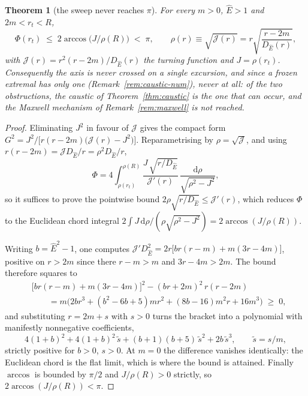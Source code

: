 \documentclass[12pt]{iopart}
\newcommand{\Ehat}{\hat E}
\newcommand{\dd}{\mathrm{d}}
\theoremstyle{plain}
\theoremstyle{definition}
\theoremstyle{plain}
\newtheorem{auxtheorem}[auxlemma]{Theorem}
\theoremstyle{remark}
\begin{document}
\begin{auxtheorem}[the sweep never reaches $\pi$]\label{thm:chord}
For every $m>0$, $\Ehat>1$ and $2m<r_t<R$,
\begin{equation}
   \Phi(r_t)\;\le\;2\arccos\!\big(J/\rho(R)\big)\;<\;\pi,
   \qquad \rho(r)\equiv\sqrt{\mathcal J(r)}=r\sqrt{\frac{r-2m}{D_{\Ehat}(r)}},
   \label{eq:chord-bound}
\end{equation}
with $\mathcal J(r)=r^2(r-2m)/D_{\Ehat}(r)$ the turning function and $J=\rho(r_t)$.
Consequently the axis is never crossed on a single excursion, and since a frozen extremal
has only one (Remark~\ref{rem:caustic-num}), never at all: of the two obstructions, the
caustic of Theorem~\ref{thm:caustic} is the one that can occur, and the Maxwell mechanism
of Remark~\ref{rem:maxwell} is not reached.
\end{auxtheorem}

\begin{proof}
Eliminating $J^2$ in favour of $\mathcal J$ gives the compact form
$G^2=J^2/\big[r(r-2m)\big(\mathcal J(r)-J^2\big)\big]$. Reparametrising by
$\rho=\sqrt{\mathcal J}$, and using $r(r-2m)=\mathcal J D_{\Ehat}/r=\rho^2D_{\Ehat}/r$,
\[
   \Phi=4\int_{\rho(r_t)}^{\rho(R)}
   \frac{J\,\sqrt{r/D_{\Ehat}}}{\mathcal J'(r)}\,
   \frac{\dd\rho}{\sqrt{\rho^2-J^2}} ,
\]
so it suffices to prove the pointwise bound $2\rho\sqrt{r/D_{\Ehat}}\le\mathcal J'(r)$,
which reduces $\Phi$ to the Euclidean chord integral
$2\int J\,\dd\rho/(\rho\sqrt{\rho^2-J^2})=2\arccos(J/\rho(R))$.

Writing $b=\Ehat^2-1$, one computes
$\mathcal J'D_{\Ehat}^2=2r\big[br(r-m)+m(3r-4m)\big]$, positive on $r>2m$ since there
$r-m>m$ and $3r-4m>2m$. The bound therefore squares to
\begin{align*}
   &\big[br(r-m)+m(3r-4m)\big]^2-(br+2m)^2\,r(r-2m)\\
   &\qquad=m\big(2br^3+(b^2-6b+5)mr^2+(8b-16)m^2r+16m^3\big)\;\ge\;0 ,
\end{align*}
and substituting $r=2m+s$ with $s>0$ turns the bracket into a polynomial with manifestly
nonnegative coefficients,
\[
   4(1+b)^2+4(1+b)^2\,\tilde s+(b+1)(b+5)\,\tilde s^{2}+2b\,\tilde s^{3},
   \qquad \tilde s=s/m ,
\]
strictly positive for $b>0$, $s>0$. At $m=0$ the difference vanishes identically: the
Euclidean chord is the flat limit, which is where the bound is attained. Finally
$\arccos$ is bounded by $\pi/2$ and $J/\rho(R)>0$ strictly, so
$2\arccos(J/\rho(R))<\pi$.
\end{proof}
\end{document}

